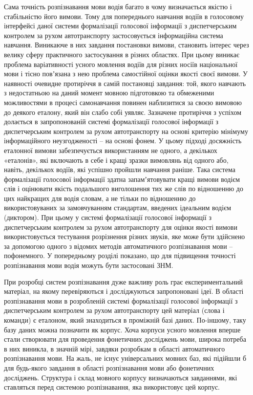 Сама точність розпізнавання мови водія багато в чому визначається якістю і стабільністю його вимови. Тому для попереднього навчання водіїв в голосовому інтерфейсі даної системи формалізації голосової інформації з диспетчерським контролем за рухом автотранспорту застосовується інформаційна система навчання. Виникаюче в них завдання постановки вимови, становить інтерес через велику сферу практичного застосування в різних областях. При цьому виникає проблема варіативності усного мовлення водіїв для різних носіїв національної мови і тісно повʼязана з нею проблема самостійної оцінки якості своєї вимови. У наявності очевидне протиріччя в самій постановці завдання: той, якого навчають з недостатньою на даний момент мовною підготовкою та обмеженими можливостями в процесі самонавчання повинен наблизитися за своєю вимовою до деякого еталону, який він слабо собі уявляє. Зазначене протиріччя з успіхом долається в запропонованій системі формалізації голосової інформації з диспетчерським контролем за рухом автотранспорту на основі критерію мінімуму інформаційного неузгодженості – на основі фонем. У цьому підході досяжність еталонної вимови забезпечується використанням не одного, а декількох «еталонів», які включають в себе і кращі зразки вимовлянь від одного або, навіть, декількох водіїв, які успішно пройшли навчання раніше. Така система формалізації голосової інформації здатна запамʼятовувати кращі вимови водієм слів і оцінювати якість подальшого виголошення тих же слів по відношенню до цих найкращих для водія словам, а не тільки по відношенню до використовуваних за замовчуванням стандартам, введених ідеальним водієм (диктором). При цьому у системі формалізації голосової інформації з диспетчерським контролем за рухом автотранспорту для оцінки якості вимови використовується тестування розрізнення різних звуків, яке може бути здійснено за допомогою одного з відомих методів автоматичного розпізнавання мови – пофонемного. У попередньому розділі показано, що для підвищення точності розпізнавання мови водія можуть бути застосовані ЗНМ.

При розробці систем розпізнавання дуже важливу роль грає експериментальний матеріал, на якому перевіряються і досліджуються запропоновані ідеї. В області розпізнавання мови в розробленій системі формалізації голосової інформації з диспетчерським контролем за рухом автотранспорту цей матеріал (слова і команди) є еталоном, який знаходиться в проміжній базі даних. По-іншому, таку базу даних можна позначити як корпус. Хоча корпуси усного мовлення вперше стали створювати для проведення фонетичних досліджень мови, широка потреба в них виникла, в значній мірі, завдяки розробкам в області автоматичного розпізнавання мови. На жаль, не існує універсальних мовних баз, які підійшли б для будь-якого завдання в області розпізнавання мови або фонетичних досліджень. Структура і склад мовного корпусу визначаються завданнями, які ставляться перед системою розпізнавання, яка використовує цей корпус.

